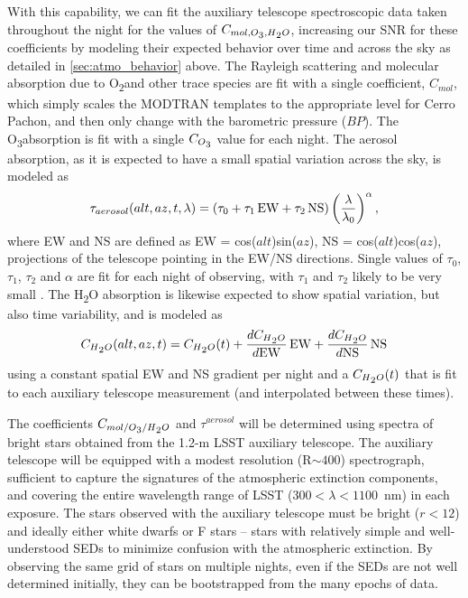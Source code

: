 \documentclass[12pt,preprint]{aastex}
\newcommand{\water}   {H\textsubscript{2}O}
\newcommand{\ozone}    {O\textsubscript{3}}
\newcommand{\oxy}     {O\textsubscript{2}}
\begin{document}
With this capability, we can fit the auxiliary telescope spectroscopic data taken
throughout the night for the values of
$C_{mol,\ozone,\water}$, increasing our SNR for these
coefficients by modeling their expected behavior over time and across
the sky as detailed in \ref{sec:atmo_behavior} above. The Rayleigh
scattering and molecular absorption due to \oxy and other trace
species are fit with a single coefficient, $C_{mol}$, which simply
scales the MODTRAN templates to the appropriate level for Cerro
Pachon, and then only change with the barometric pressure ($BP$). The
\ozone absorption is fit with a single $C_{\ozone}$ value for each
night. The aerosol absorption, as it is expected to have a small
spatial variation across the sky, is modeled as 
\begin{equation}
\label{eqn:tau_aerosol}
\tau_{aerosol}(alt,az,t,\lambda) = (\tau_0 + \tau_1\,{\rm EW} +
\tau_2\,{\rm NS}) \left({\lambda \over \lambda_0}\right)^{\alpha},
\end{equation}
where EW and NS are defined as EW = cos($alt$)sin($az$), NS =
cos($alt$)cos($az$), projections of the telescope pointing in the
EW/NS directions. Single values of $\tau_0$, $\tau_1$, $\tau_2$ and $\alpha$ are
fit for each night of observing, with $\tau_1$ and
$\tau_2$ likely to be very small \citep{Burke2010b}. The \water
absorption is likewise expected to show spatial variation, but also
time variability, and is modeled as
\begin{equation}
\label{eqn:coeff_h2o}
C_{\water}(alt,az,t) = C_{\water}(t) + {dC_{\water} \over d{\rm EW}}\,{\rm EW} +
{dC_{\water} \over d{\rm NS}}\,{\rm NS}
\end{equation}
using a constant spatial EW and NS gradient per night and a $C_{\water}(t)$ that 
is fit to each auxiliary telescope measurement (and interpolated
between these times). 

The coefficients $C_{mol/\ozone/\water}$ and $\tau^{aerosol}$ will be
determined using spectra of bright stars obtained from the 1.2-m LSST
auxiliary telescope. The auxiliary telescope will be equipped with a
modest resolution (R$\sim400$) spectrograph, sufficient to capture the
signatures of the atmospheric extinction components, and covering the
entire wavelength range of LSST ($300<\lambda<1100$~nm) in each
exposure. The stars observed with the auxiliary telescope must be
bright ($r<12$) and ideally either white dwarfs or F stars -- stars with relatively
simple and well-understood SEDs to minimize confusion with the
atmospheric extinction. By observing the same grid of stars on
multiple nights, even if the SEDs are not well determined initially,
they can be bootstrapped from the many epochs of data. 
\end{document}
